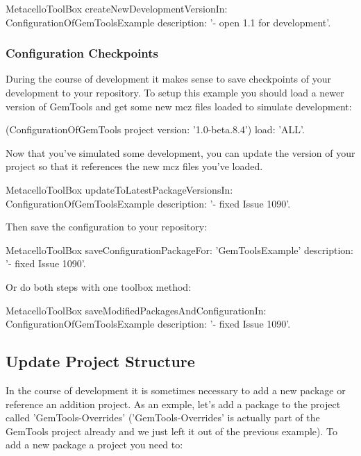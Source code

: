 \documentclass[a4paper,10pt,twoside]{book}
\begin{document}
\begin{code}{}
\begin{code}{}
\begin{code}{}
MetacelloToolBox
  createNewDevelopmentVersionIn: ConfigurationOfGemToolsExample
  description: '- open 1.1 for development'.
\end{code}

\subsubsection{Configuration Checkpoints}

During the course of development it makes sense to save checkpoints of your development to your repository. To setup this example you should load a newer version of GemTools and get some new mcz files loaded to simulate development:

\begin{code}{}
(ConfigurationOfGemTools project version: '1.0-beta.8.4')
  load: 'ALL'.
\end{code}  

Now that you've simulated some development, you can update the  version of your project so that it references the new mcz files you've loaded.

\begin{code}{}
MetacelloToolBox
  updateToLatestPackageVersionsIn: ConfigurationOfGemToolsExample
  description: '- fixed Issue 1090'.
 \end{code} 
 
Then save the configuration to your repository:

\begin{code}{}
MetacelloToolBox
  saveConfigurationPackageFor: 'GemToolsExample'
  description: '- fixed Issue 1090'.
 \end{code}
    
Or do both steps with one toolbox method:

\begin{code}{}
MetacelloToolBox
  saveModifiedPackagesAndConfigurationIn: ConfigurationOfGemToolsExample
  description: '- fixed Issue 1090'.
\end{code}
  
\subsection{Update Project Structure}

In the course of development it is sometimes necessary to add a new package or reference an addition project. As an exmple, let's add a package to the project called 'GemTools-Overrides' ('GemTools-Overrides' is actually part of the GemTools project already and we just left it out of the previous example). To add a new package a project you need to:


\end{code}
\end{code}
\end{document}
